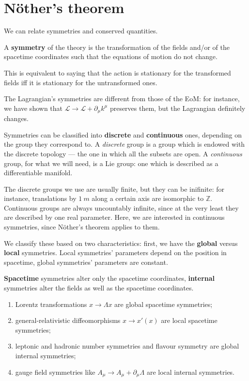 \documentclass[main.tex]{subfiles}
\begin{document}
\section{Nöther's theorem}


We can relate symmetries and conserved quantities. 

\begin{definition}
A \textbf{symmetry} of the theory is the transformation of the fields and/or of the spacetime coordinates such that the equations of motion do not change.
\end{definition}

This is equivalent to saying that the action is stationary for the transformed fields iff it is stationary for the untransformed ones. 

The Lagrangian's symmetries are different from those of the EoM: for instance, we have shown that \(\mathscr{L} \to \mathscr{L} + \partial_{\mu } k^{\mu }\) preserves them, but the Lagrangian definitely changes.

Symmetries can be classified into \textbf{discrete} and \textbf{continuous} ones, depending on the group they correspond to. 
A \emph{discrete} group is a group which is endowed with the discrete topology --- the one in which all the subsets are open. 
A \emph{continuous} group, for what we will need, is a Lie group: one which is described as a differentiable manifold. 

The discrete groups we use are usually finite, but they can be inifinite: for instance, translations by \(\SI{1}{m}\) along a certain axis are isomorphic to \(\mathbb{Z}\).  
Continuous groups are always uncountably infinite, since at the very least they are described by one real parameter. 
Here, we are interested in continuous symmetries, since Nöther's theorem applies to them.

We classify these based on two characteristics: first, we have the \textbf{global} versus \textbf{local} symmetries.
Local symmetries' parameters depend on the position in spacetime, global symmetries' parameters are constant. 

\textbf{Spacetime} symmetries alter only the spacetime coordinates, \textbf{internal} symmetries alter the fields as well as the spacetime coordinates. 

\begin{enumerate}
    \item Lorentz transformations \(x \to \Lambda x\) are global spacetime symmetries;
    \item general-relativistic diffeomorphisms \(x \to x'(x)\) are local spacetime symmetries;
    \item leptonic and hadronic number symmetries and flavour symmetry are global internal symmetries;
    \item gauge field symmetries like \(A_{\mu } \to A_{\mu } + \partial_{\mu } \Lambda \) are local internal symmetries. 
\end{enumerate}
\end{document}
